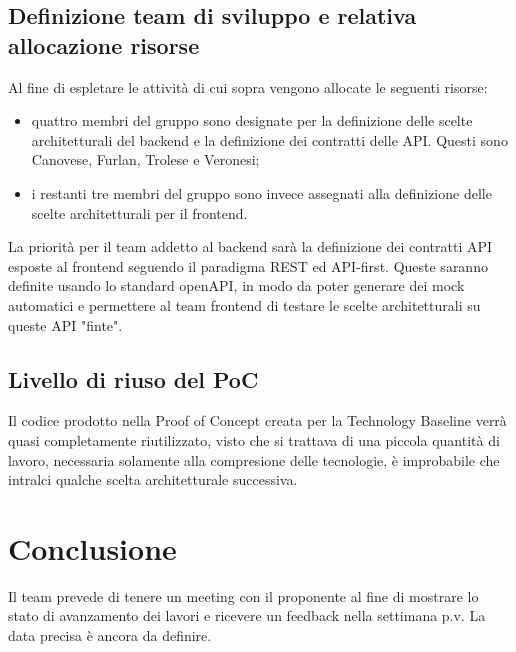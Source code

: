 \subsection{Definizione team di sviluppo e relativa allocazione risorse}
Al fine di espletare le attività di cui sopra vengono allocate le seguenti risorse:
\begin{itemize}
	\item quattro membri del gruppo sono designate per la definizione delle scelte architetturali del backend e la definizione dei contratti delle API. Questi sono Canovese, Furlan, Trolese e Veronesi;
	\item i restanti tre membri del gruppo sono invece assegnati alla definizione delle scelte architetturali per il frontend.
\end{itemize}
La priorità per il team addetto al backend sarà la definizione dei contratti API esposte al frontend seguendo il paradigma REST ed API-first.
Queste saranno definite usando lo standard openAPI, in modo da poter generare dei mock automatici e permettere al team frontend di testare le scelte architetturali su queste API "finte".

\subsection{Livello di riuso del PoC}
Il codice prodotto nella Proof of Concept creata per la Technology Baseline verrà quasi completamente riutilizzato, visto che si trattava di una piccola quantità di lavoro, necessaria solamente alla compresione
delle tecnologie, è improbabile che intralci qualche scelta architetturale successiva.

\section{Conclusione}
Il team prevede di tenere un meeting con il proponente al fine di mostrare lo stato di avanzamento dei lavori e ricevere un feedback nella settimana p.v. La data precisa è ancora da definire.